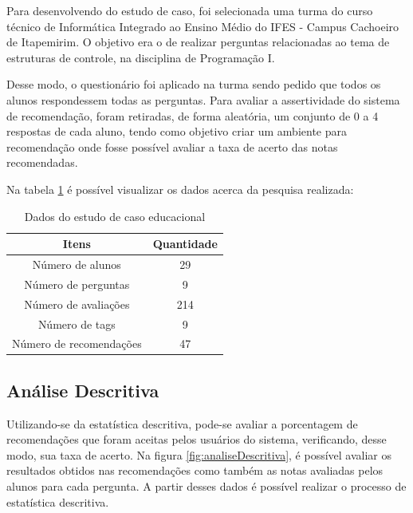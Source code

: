 Para desenvolvendo do estudo de caso, foi selecionada uma turma do curso técnico de Informática Integrado ao Ensino Médio do IFES - Campus Cachoeiro de Itapemirim. O objetivo era o de realizar perguntas relacionadas ao tema de estruturas de controle, na disciplina de Programação I.

Desse modo, o questionário foi aplicado na turma sendo pedido que todos os alunos respondessem todas as perguntas. Para avaliar a assertividade do sistema de recomendação, foram retiradas, de forma aleatória, um conjunto de 0 a 4 respostas de cada aluno, tendo como objetivo criar um ambiente para recomendação onde fosse possível avaliar a taxa de acerto das notas recomendadas.

Na tabela \ref{tableref:dadosEstudoCasoEducacional} é possível visualizar os dados acerca da pesquisa realizada:

\begin{table}[H]
\centering
\begin{tabular}{|c|c|}
\hline
\textbf{Itens}          & \textbf{Quantidade} \\ \hline
Número de alunos        & 29                  \\ \hline
Número de perguntas     & 9                   \\ \hline
Número de avaliações    & 214                 \\ \hline
Número de tags          & 9                   \\ \hline
Número de recomendações & 47                  \\ \hline
\end{tabular}
\caption{Dados do estudo de caso educacional}
\label{tableref:dadosEstudoCasoEducacional}
\end{table}

\subsection{Análise Descritiva}

Utilizando-se da estatística descritiva, pode-se avaliar a porcentagem de recomendações que foram aceitas pelos usuários do sistema, verificando, desse modo, sua taxa de acerto. Na figura \ref{fig:analiseDescritiva}, é possível avaliar os resultados obtidos nas recomendações como também as notas avaliadas pelos alunos para cada pergunta. A partir desses dados é possível realizar o processo de estatística descritiva.

